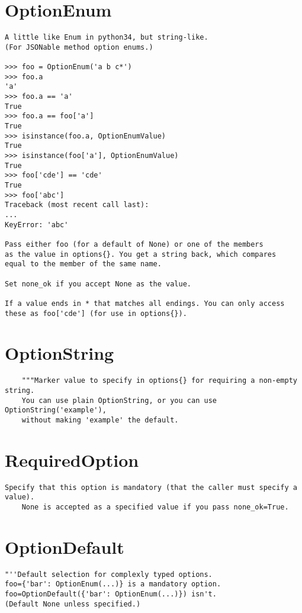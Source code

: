 \section{OptionEnum}
\begin{verbatim}
A little like Enum in python34, but string-like.
(For JSONable method option enums.)

>>> foo = OptionEnum('a b c*')
>>> foo.a
'a'
>>> foo.a == 'a'
True
>>> foo.a == foo['a']
True
>>> isinstance(foo.a, OptionEnumValue)
True
>>> isinstance(foo['a'], OptionEnumValue)
True
>>> foo['cde'] == 'cde'
True
>>> foo['abc']
Traceback (most recent call last):
...
KeyError: 'abc'

Pass either foo (for a default of None) or one of the members
as the value in options{}. You get a string back, which compares
equal to the member of the same name.

Set none_ok if you accept None as the value.

If a value ends in * that matches all endings. You can only access
these as foo['cde'] (for use in options{}).
\end{verbatim}



\section{OptionString}
\begin{verbatim}
    """Marker value to specify in options{} for requiring a non-empty string.
    You can use plain OptionString, or you can use OptionString('example'),
    without making 'example' the default.
\end{verbatim}



\section{RequiredOption}
\begin{verbatim}
Specify that this option is mandatory (that the caller must specify a value).
    None is accepted as a specified value if you pass none_ok=True.
\end{verbatim}



\section{OptionDefault}
\begin{verbatim}
"''Default selection for complexly typed options.
foo={'bar': OptionEnum(...)} is a mandatory option.
foo=OptionDefault({'bar': OptionEnum(...)}) isn't.
(Default None unless specified.)
\end{verbatim}



